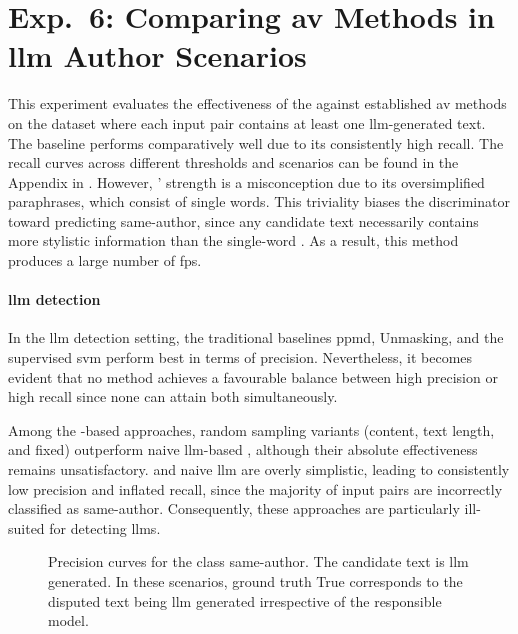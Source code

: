 \section{Exp.\ 6: Comparing \acs{av} Methods in \acs{llm} Author Scenarios}
\label{sec:results_llm_av}

This experiment evaluates the effectiveness of the \impAppr{} against established \ac{av} methods on the \dataArtificialStudent{} dataset where each input pair contains at least one \ac{llm}-generated text.  
The baseline \mirrorMinds{} performs comparatively well due to its consistently high recall.  
The recall curves across different thresholds and scenarios can be found in the Appendix in .  
However, \mirrorMinds{}' strength is a misconception due to its oversimplified paraphrases, which consist of single words.  
This triviality biases the discriminator toward predicting same-author, since any candidate text necessarily contains more stylistic information than the single-word \imps{}.  
As a result, this method produces a large number of \acp{fp}.


\paragraph{\ac{llm} detection}

In the \ac{llm} detection setting, the traditional baselines \ac{ppmd}, Unmasking, and the supervised \ac{svm} perform best in terms of precision.  
Nevertheless, it becomes evident that no method achieves a favourable balance between high precision or high recall since none can attain both simultaneously.  

Among the \imp{}-based approaches, random sampling variants (content, text length, and fixed) outperform naive \ac{llm}-based \imps{}, although their absolute effectiveness remains unsatisfactory.  
\mirrorMinds{} and naive \ac{llm} \imps{} are overly simplistic, leading to consistently low precision and inflated recall, since the majority of input pairs are incorrectly classified as same-author.  
Consequently, these approaches are particularly ill-suited for detecting \acp{llm}.

\begin{figure}[h]
  
\caption[\ac{llm} detection precision curves.]{Precision curves for the class same-author. 
The candidate text is \ac{llm} generated.
In these scenarios, ground truth True corresponds to the disputed text being \ac{llm} generated irrespective of the responsible model.
}
\label{fig:llm_detection_prec}
\end{figure}

